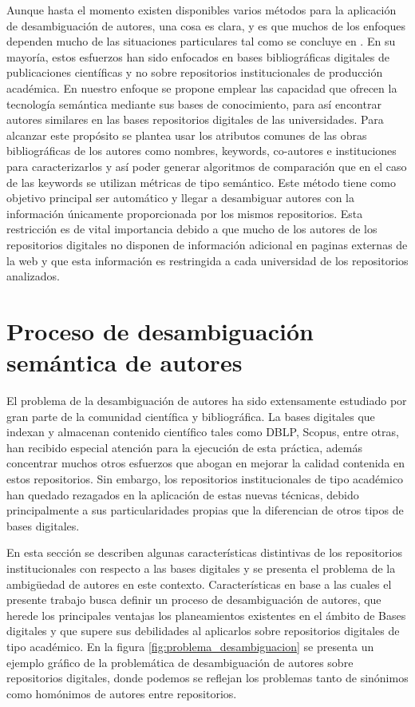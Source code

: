 \documentclass[conference]{IEEEtran}
\begin{document}
Aunque  hasta el momento existen disponibles varios métodos para la aplicación de desambiguación de autores, una cosa es clara, y es que muchos de los enfoques dependen mucho de las situaciones particulares tal como se concluye en \cite{Smalheiser:2009:AND:1951529.1951542}. En su mayoría, estos esfuerzos han sido enfocados en bases bibliográficas digitales de publicaciones científicas  y no sobre repositorios institucionales de producción académica.  En nuestro enfoque se propone emplear las capacidad que ofrecen la tecnología semántica mediante sus bases de conocimiento, para así encontrar autores similares en las bases repositorios digitales de las universidades. Para alcanzar  este propósito se plantea usar los atributos comunes de las obras bibliográficas de los autores como nombres, keywords, co-autores e instituciones para caracterizarlos   y así poder generar algoritmos de comparación que en el caso de las keywords se utilizan métricas de tipo semántico.  Este método tiene como objetivo principal ser automático y llegar a desambiguar autores con la información únicamente proporcionada por  los mismos repositorios. Esta restricción es de vital importancia debido a que mucho de los autores de los repositorios digitales no disponen de información adicional en paginas externas de la web y que esta información es restringida a cada universidad de los repositorios analizados.


\section{Proceso de desambiguación semántica de autores}
\label{sec:proceso_desambiguacion_semantica}
El problema de la desambiguación de autores ha sido extensamente estudiado por gran parte de la comunidad científica y bibliográfica. La bases digitales que indexan y almacenan contenido científico tales como DBLP, Scopus, entre otras, han recibido especial atención para la ejecución de esta práctica, además concentrar muchos otros esfuerzos que abogan en mejorar la calidad contenida en estos repositorios. Sin embargo, los repositorios institucionales de tipo académico  han quedado rezagados en la aplicación de estas nuevas técnicas, debido principalmente  a sus particularidades propias que la diferencian de otros tipos de bases digitales. 

En esta sección se describen algunas características distintivas de los repositorios institucionales con respecto a las bases digitales y se presenta el problema de la ambigüedad de autores en este contexto. Características en base a las cuales el presente trabajo busca definir un proceso de desambiguación de autores, que herede los principales ventajas los planeamientos existentes en el ámbito de Bases digitales y que supere sus debilidades al aplicarlos sobre repositorios digitales de  tipo académico. En la figura \ref{fig:problema_desambiguacion} se presenta un ejemplo gráfico de la problemática de desambiguación de autores sobre repositorios digitales, donde podemos se reflejan los problemas tanto de sinónimos como homónimos de autores  entre repositorios.
\end{document}
